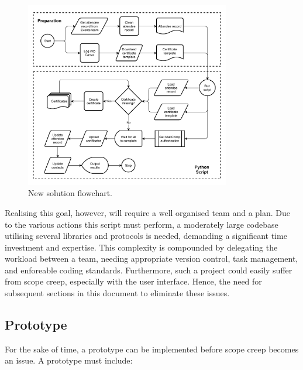 \documentclass[11pt]{article}
\begin{document}
\begin{figure}[b!]
    \centering
    \includegraphics[width=0.8\textwidth]{figures/new_solution.pdf}
    \caption{New solution flowchart.}
    \label{fig:new-solution}
\end{figure}

Realising this goal, however, will require a well organised team and a plan. Due to the various actions this script must perform, a moderately large codebase utilising several libraries and protocols is needed, demanding a significant time investment and expertise. This complexity is compounded by delegating the workload between a team, needing appropriate version control, task management, and enforeable coding standards. Furthermore, such a project could easily suffer from scope creep, especially with the user interface. Hence, the need for subsequent sections in this document to eliminate these issues.

\subsection{Prototype}

For the sake of time, a prototype can be implemented before scope creep becomes an issue. A prototype must include:
\end{document}
